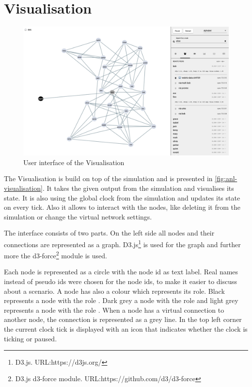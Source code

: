 \section{Visualisation}

\begin{figure}
\centering
\includegraphics[width=1\textwidth]{graphics/analysis-tools/visualisation-overlay.jpg}
\caption{User interface of the Visualisation}
\label{fig:anl-visualisation}
\end{figure}

The Visualisation is build on top of the simulation and is presented in \vref{fig:anl-visualisation}. It takes the given output from the simulation and visualises its state. It is also using the global clock from the simulation and updates its state on every tick. Also it allows to interact with the nodes, like deleting it from the simulation or change the virtual network settings.

The interface consists of two parts. On the left side all nodes and their connections are represented as a graph. D3.js\footnote{D3.js. URL:{https://d3js.org/}} is used for the graph and further more the d3-force\footnote{D3.js d3-force module. URL:{https://github.com/d3/d3-force}} module is used.

Each node is represented as a circle with the node id as text label. Real names instead of pseudo ids were chosen for the node ids, to make it easier to discuss about a scenario. A node has also a colour which represents its role. Black represents a node with the role \signal. Dark grey a node with the role \router and light grey represents a node with the role \peer.  
When a node has a virtual connection to another node, the connection is represented as a grey line.
In the top left corner the current clock tick is displayed with an icon that indicates whether the clock is ticking or paused.

